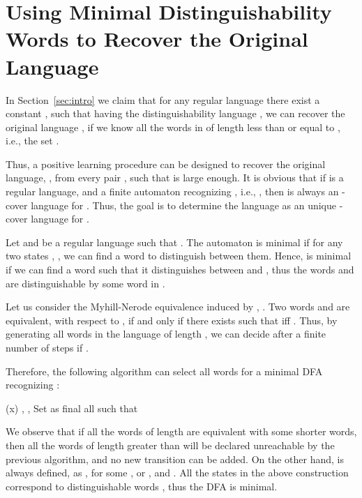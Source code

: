 \documentclass{article}
\newcommand{\Succ}[1]{\mathsf{Succ}(#1)}
\begin{document}
\section{Using Minimal Distinguishability Words  to Recover the Original \mbox{Language}}
\label{sec:recoverL}

In Section~\ref{sec:intro}  we claim that for any regular language  there exist a constant , such that 
having the distinguishability language ,
we can recover the original language , if we know all the words in  of length less than or equal to , i.e., 
the set .

Thus, a positive learning procedure can be designed to recover
 the original language, ,
from every pair , such that  is large enough.
It is obvious that if  is a regular language, and  
a finite automaton recognizing , i.e., , then  is always 
an -cover language for .
Thus, the goal is to determine the language  as an unique -cover language
for .

Let  and  be a regular language such that .
The automaton  is minimal if for any two states , ,
we can find a word to distinguish between them. 
Hence,   is minimal if we can find a word  such that it distinguishes between  and , 
thus the words  and  are distinguishable by some word in .

Let us consider the Myhill-Nerode equivalence induced by , .
Two words  and  are equivalent, with respect to , if and only if there exists
 such that  iff .
Thus, by generating all words in the language of length
, we can decide 
after a finite number of steps if .

Therefore, the following algorithm can select all words  for a minimal DFA
recognizing :

\begin{algorithmic}[1]
\State 
\State \Succ{x}
\While {} 
    \If {} 
        \State 
    \Else 
        \State {}
    \EndIf
    \State , 
    \label{checkReachable} 
        \State , 
    \EndWhile
\EndWhile
\State Set as final all  such that 
\end{algorithmic}



We observe that if all the words of length  are equivalent 
with some shorter words,
then all the words of length  greater than  will be declared unreachable by the previous algorithm, 
and no new transition can be added.
On the other hand,  is always defined, as , for some , or
, and .
All the states in the above construction correspond to distinguishable words ,
 thus the DFA is minimal.
\end{document}
